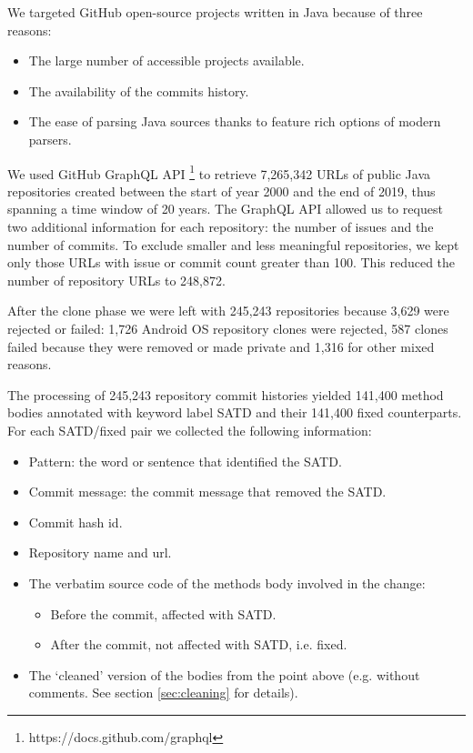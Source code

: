 We targeted GitHub open-source projects written in Java because of three reasons:
\begin{itemize}
    \item The large number of accessible projects available.
    \item The availability of the commits history. 
    \item The ease of parsing Java sources thanks to feature rich options of modern parsers.
\end{itemize}
We used GitHub GraphQL API \footnote{https://docs.github.com/graphql} to retrieve 7,265,342 URLs of public Java repositories created between the start of year 2000 and the end of 2019, thus spanning a time window of 20 years.
The GraphQL API allowed us to request two additional information for each repository: the number of issues and the number of commits. To exclude smaller and less meaningful repositories, we kept only those URLs with issue or commit count greater than 100. This reduced the number of repository URLs to 248,872.

After the clone phase we were left with 245,243 repositories because 3,629 were rejected or failed: 1,726 Android OS repository clones were rejected, 587 clones failed because they were removed or made private and 1,316 for other mixed reasons.

The processing of 245,243 repository commit histories yielded 141,400 method bodies annotated with keyword label SATD and their 141,400 fixed counterparts. For each SATD/fixed pair we collected the following information:
\begin{itemize}
    \item Pattern: the word or sentence that identified the SATD.
    \item Commit message: the commit message that removed the SATD.
    \item Commit hash id.
    \item Repository name and url.
    \item The verbatim source code of the methods body involved in the change: 
    \begin{itemize}
    \item Before the commit, affected with SATD. 
    \item After the commit, not affected with SATD, i.e. fixed.
    \end{itemize}
\item The `cleaned' version of the bodies from the point above (e.g. without comments. See section \ref{sec:cleaning} for details).
\end{itemize}

